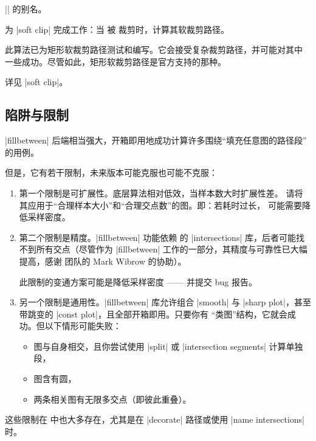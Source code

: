 \begin{command}{\tikzpathintersectionsegments{}}
    || 的别名。
\end{command}

\begin{command}{\pgfpathcomputesoftclippath{}}
    为 |soft clip| 完成工作：当  被
     裁剪时，计算其软裁剪路径。

    此算法已为矩形软裁剪路径测试和编写。它会接受复杂裁剪路径，并可能对其中
    一些成功。尽管如此，矩形软裁剪路径是官方支持的那种。

    详见 |soft clip|。
\end{command}


\subsection{陷阱与限制}

|fillbetween| 后端相当强大，开箱即用地成功计算许多围绕“填充任意图的路径段”
的用例。

但是，它有若干限制，未来版本可能克服也可能不克服：
%
\begin{enumerate}
    \item 第一个限制是可扩展性。底层算法相对低效，当样本数大时扩展性差。
        请将其应用于“合理样本大小”和“合理交点数”的图。即：若耗时过长，
        可能需要降低采样密度。
    \item 第二个限制是精度。|fillbetween| 功能依赖 \pgfname{} 的
        |intersections| 库，后者可能找不到所有交点（尽管作为 |fillbetween|
        工作的一部分，其精度与可靠性已大幅提高，感谢 \pgfname{} 团队的
        Mark Wibrow 的协助）。

        此限制的变通方案可能是降低采样密度 —— 并提交 bug 报告。
    \item 另一个限制是通用性。|fillbetween| 库允许组合 |smooth| 与
        |sharp plot|，甚至带跳变的 |const plot|，且全部开箱即用。只要你有
        “类图”结构，它就会成功。但以下情形可能失败：
        \begin{itemize}
            \item 图与自身相交，且你尝试使用 |split| 或
                |intersection segments| 计算单独段，
            \item 图含有圆，
            \item 两条相关图有无限多交点（即彼此重叠）。
        \end{itemize}
\end{enumerate}
%
这些限制在 \pgfname{} 中也大多存在，尤其是在 |decorate| 路径或使用
|name intersections| 时。
\endgroup

